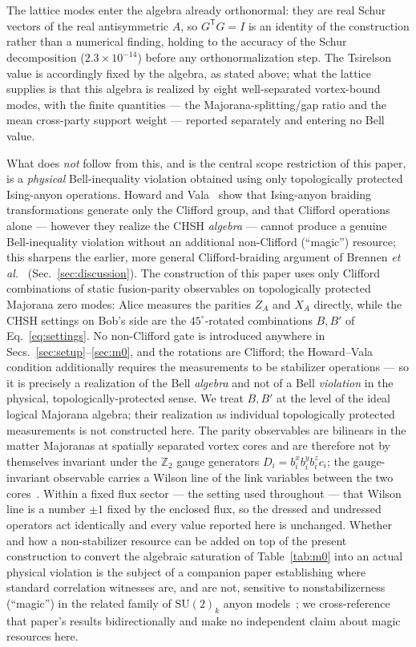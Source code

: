 \documentclass[aps,pra,twocolumn,superscriptaddress,floatfix,nofootinbib]{revtex4-2}
\begin{document}
The lattice modes enter the algebra already orthonormal: they are real
Schur vectors of the real antisymmetric $\hat A$, so
$G^\mathsf{T}G = I$ is an identity of the construction rather than a
numerical finding, holding to the accuracy of the Schur decomposition
($2.3\times10^{-14}$) before any orthonormalization step. The Tsirelson
value is accordingly fixed by the algebra, as stated above; what the
lattice supplies is that this algebra is realized by eight
well-separated vortex-bound modes, with the finite quantities --- the
Majorana-splitting/gap ratio and the mean cross-party support weight
--- reported separately and entering no Bell value.

What does \emph{not} follow from this, and is the central scope
restriction of this paper, is a \emph{physical} Bell-inequality
violation obtained using only topologically protected Ising-anyon
operations. Howard and Vala~\cite{HowardVala2012} show that Ising-anyon
braiding transformations generate only the Clifford group, and that
Clifford operations alone --- however they realize the CHSH
\emph{algebra} --- cannot produce a genuine Bell-inequality violation
without an additional non-Clifford (``magic'') resource; this
sharpens the earlier, more general Clifford-braiding argument of
Brennen \emph{et al.}~\cite{Brennen2009} (Sec.~\ref{sec:discussion}).
The construction of this paper uses only Clifford combinations of
static fusion-parity observables on topologically protected Majorana
zero modes: Alice measures the parities $Z_A$ and $X_A$ directly, while
the CHSH settings on Bob's side are the $45^\circ$-rotated combinations
$B,B'$ of Eq.~\eqref{eq:settings}. No non-Clifford gate is introduced
anywhere in Secs.~\ref{sec:setup}--\ref{sec:m0}, and the rotations are
Clifford; the Howard--Vala condition additionally requires the
measurements to be stabilizer operations --- so it is precisely a
realization of
the Bell \emph{algebra} and not of a Bell \emph{violation} in the
physical, topologically-protected sense. We treat $B,B'$ at the level
of the ideal logical Majorana algebra; their realization as individual
topologically protected measurements is not constructed here. The
parity observables are bilinears in the matter Majoranas at spatially
separated vortex cores and are therefore not by themselves invariant
under the $\mathbb{Z}_2$ gauge generators
$D_i = b^x_i b^y_i b^z_i c_i$; the gauge-invariant observable carries a
Wilson line of the link variables between the two
cores~\cite{Petrova2014}. Within a fixed flux sector --- the setting
used throughout --- that Wilson line is a number $\pm1$ fixed by the
enclosed flux, so the dressed and undressed operators act identically
and every value reported here is unchanged. Whether and how a
non-stabilizer resource can be added on top of the present construction
to convert the algebraic saturation of Table~\ref{tab:m0} into an
actual physical violation is the subject of a companion paper
establishing where standard correlation witnesses are, and are not,
sensitive to nonstabilizerness (``magic'') in the related family of
$\mathrm{SU}(2)_k$ anyon models~\cite{Sayim2026magic}; we cross-reference
that paper's results bidirectionally and make no independent claim
about magic resources here.
\end{document}
